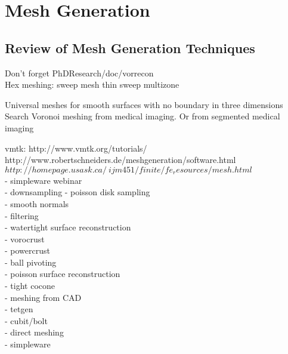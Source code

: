\chapter{Mesh Generation}
%


\section{Review of Mesh Generation Techniques}
\label{Review of Mesh Generation Techniques}

Don't forget PhDResearch/doc/vorrecon \\

Hex meshing:
sweep mesh
thin sweep
multizone

Universal meshes for smooth surfaces with no boundary in three dimensions \\

Search Voronoi meshing from medical imaging. Or from segmented medical imaging

vmtk: http://www.vmtk.org/tutorials/ \\

http://www.robertschneiders.de/meshgeneration/software.html \\

$http://homepage.usask.ca/~ijm451/finite/fe_resources/mesh.html$ \\

- simpleware webinar \\

- downsampling - poisson disk sampling\\
- smooth normals\\
- filtering\\

- watertight surface reconstruction\\
	- vorocrust\\
	- powercrust\\
	- ball pivoting\\
	- poisson surface reconstruction\\
	- tight cocone\\
	
- meshing from CAD\\
    - tetgen\\
    - cubit/bolt\\
    
- direct meshing\\
	- simpleware\\

